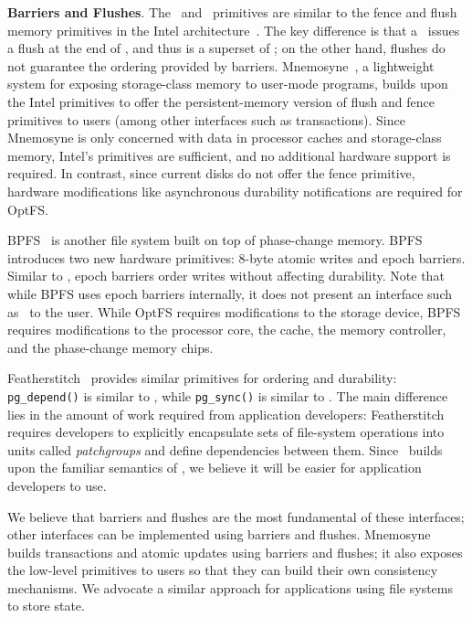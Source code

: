 \vspace{0.1in} \noindent \textbf{Barriers and Flushes}. The \syscsync\
and \sysdsync\ primitives are similar to the fence and flush memory
primitives in the Intel architecture~\cite{Intel2010-Arch}. The key
difference is that a \sysdsync\ issues a flush at the end of
\syscsync, and thus is a superset of \syscsync; on the other hand,
flushes do not guarantee the ordering provided by barriers.
Mnemosyne~\cite{Volos+11-Mnemosyne}, a lightweight system for exposing
storage-class memory to user-mode programs, builds upon the Intel
primitives to offer the persistent-memory version of flush and fence
primitives to users (among other interfaces such as transactions).
Since Mnemosyne is only concerned with data in processor caches and
storage-class memory, Intel's primitives are sufficient, and no
additional hardware support is required. In contrast, since current
disks do not offer the fence primitive, hardware modifications like
asynchronous durability notifications are required for OptFS.

BPFS~\cite{Condit+09-BPFS} is another file system built on top of
phase-change memory. BPFS introduces two new hardware primitives:
8-byte atomic writes and epoch barriers. Similar to \syscsync, epoch
barriers order writes without affecting durability. Note that while
BPFS uses epoch barriers internally, it does not present an interface
such as \syscsync\ to the user. While OptFS requires modifications to
the storage device, BPFS requires modifications to the processor core,
the cache, the memory controller, and the phase-change memory chips.

Featherstitch~\cite{Frost+07-GenFSDep} provides similar primitives for
ordering and durability: \texttt{pg\_depend()} is similar to
\syscsync, while \texttt{pg\_sync()} is similar to \sysdsync. The main
difference lies in the amount of work required from application
developers: Featherstitch requires developers to explicitly
encapsulate sets of file-system operations into units called
\emph{patchgroups} and define dependencies between them. Since
\syscsync\ builds upon the familiar semantics of \sysfsync, we believe
it will be easier for application developers to use.

We believe that barriers and flushes are the most fundamental of these
interfaces; other interfaces can be implemented using barriers and
flushes. Mnemosyne~\cite{Volos+11-Mnemosyne} builds transactions and
atomic updates using barriers and flushes; it also exposes the
low-level primitives to users so that they can build their own
consistency mechanisms. We advocate a similar approach for
applications using file systems to store state.
